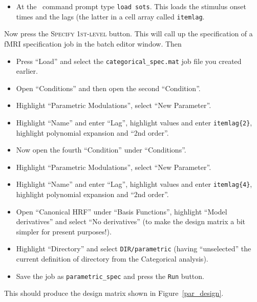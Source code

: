 \begin{itemize}
\item At the \matlab\ command prompt type \texttt{load sots}. This loads the stimulus onset times and the lags (the latter in a cell array called \texttt{itemlag}.
\end{itemize}

Now press the \textsc{Specify 1st-level} button. This will call up the specification of a fMRI specification job in the batch editor window. Then
\begin{itemize}
\item Press ``Load'' and select the \texttt{categorical\_spec.mat} job file you created earlier.
\item Open ``Conditions'' and then open the second ``Condition''.
\item Highlight ``Parametric Modulations'', select ``New Parameter''.
\item Highlight ``Name'' and enter ``Lag'', highlight values and enter \texttt{itemlag\{2\}}, highlight polynomial expansion and ``2nd order''.
\item Now open the fourth ``Condition'' under ``Conditions''.
\item Highlight ``Parametric Modulations'', select ``New Parameter''.
\item Highlight ``Name'' and enter ``Lag'', highlight values and enter \texttt{itemlag\{4\}}, highlight polynomial expansion and ``2nd order''.
\item Open ``Canonical HRF'' under ``Basis Functions'', highlight ``Model derivatives'' and select ``No derivatives'' (to make the design matrix a bit simpler for present purposes!).
\item Highlight ``Directory'' and select \texttt{DIR/parametric} (having ``unselected'' the current definition of directory from the Categorical analysis).
\item Save the job as \texttt{parametric\_spec} and press the \texttt{Run} button.
\end{itemize}

This should produce the design matrix shown in Figure~\ref{par_design}.


